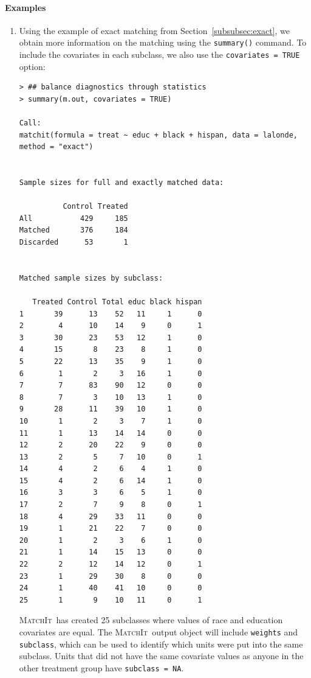 \documentclass[oneside,letterpaper,titlepage]{article}
\newcommand{\MatchIt}{\textsc{MatchIt}}
\begin{document}
\paragraph{Examples}
\begin{enumerate}
\item Using the example of exact matching from
  Section~\ref{subsubsec:exact}, we obtain more information on the
  matching using the {\tt summary()} command.  To include the
  covariates in each subclass, we also use the \texttt{covariates =
    TRUE} option:
\begin{verbatim}
> ## balance diagnostics through statistics
> summary(m.out, covariates = TRUE)

Call:
matchit(formula = treat ~ educ + black + hispan, data = lalonde, method = "exact")


Sample sizes for full and exactly matched data:

          Control Treated
All           429     185
Matched       376     184
Discarded      53       1


Matched sample sizes by subclass:

   Treated Control Total educ black hispan
1       39      13    52   11     1      0
2        4      10    14    9     0      1
3       30      23    53   12     1      0
4       15       8    23    8     1      0
5       22      13    35    9     1      0
6        1       2     3   16     1      0
7        7      83    90   12     0      0
8        7       3    10   13     1      0
9       28      11    39   10     1      0
10       1       2     3    7     1      0
11       1      13    14   14     0      0
12       2      20    22    9     0      0
13       2       5     7   10     0      1
14       4       2     6    4     1      0
15       4       2     6   14     1      0
16       3       3     6    5     1      0
17       2       7     9    8     0      1
18       4      29    33   11     0      0
19       1      21    22    7     0      0
20       1       2     3    6     1      0
21       1      14    15   13     0      0
22       2      12    14   12     0      1
23       1      29    30    8     0      0
24       1      40    41   10     0      0
25       1       9    10   11     0      1
\end{verbatim}
\MatchIt\ has created 25 subclasses where values of race and education
covariates are equal.  The \MatchIt\ output object will include
\texttt{weights} and \texttt{subclass}, which can be used to identify
which units were put into the same subclass.  Units that did not have
the same covariate values as anyone in the other treatment group have
\texttt{subclass = NA}.


\end{enumerate}
\end{document}

